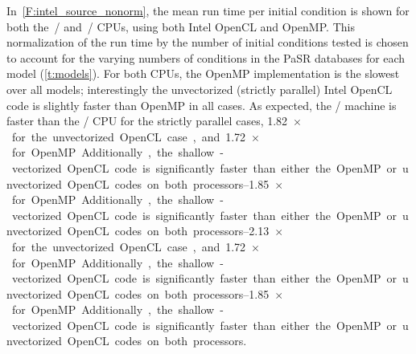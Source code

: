 \documentclass[12pt,number,sort&compress,preprint]{elsarticle}
\begin{document}
In~\cref{F:intel_source_nonorm}, the mean run time per initial condition is shown for both the~\avx/ and~\sse/ CPUs, using both Intel OpenCL and OpenMP.
This normalization of the run time by the number of initial conditions tested is chosen to account for the varying numbers of conditions in the PaSR databases for each model (\cref{t:models}).
For both CPUs, the OpenMP implementation is the slowest over all models; interestingly the unvectorized (strictly parallel) Intel OpenCL code is slightly faster than OpenMP in all cases.
As expected, the \avx/ machine is faster than the \sse/ CPU for the strictly parallel cases, \SIrange{1.82}{2.13}{$\times$} for the unvectorized OpenCL case, and \SIrange{1.72}{1.85}{$\times$} for OpenMP.
Additionally, the shallow-vectorized OpenCL code is significantly faster than either the OpenMP or unvectorized OpenCL codes on both processors.
\end{document}
